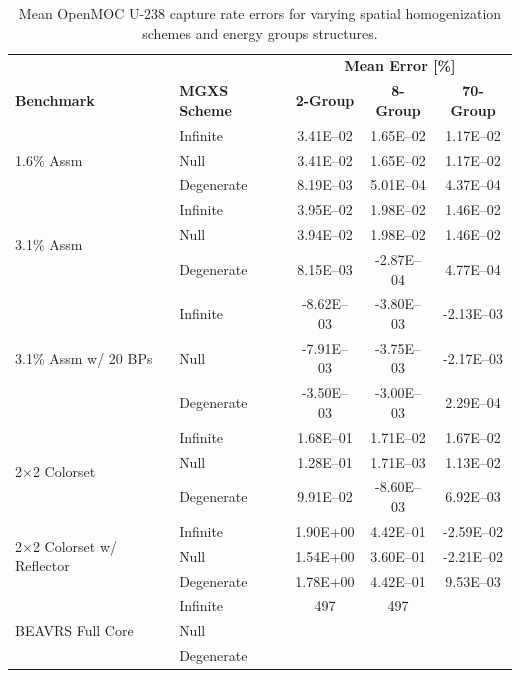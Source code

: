 \begin{table}[h!]
  \centering
  \caption[Mean OpenMOC U-238 capture rate errors]{Mean OpenMOC U-238 capture rate errors for varying spatial homogenization schemes and energy groups structures.}
  \small
  \label{table:chap8-openmoc-mean-capt-rates}
  \vspace{6pt}
  \begin{tabular}{l l c c c}
  \toprule
  \rowcolor{lightgray}
  & & \multicolumn{3}{c}{\cellcolor{lightgray} \textbf{Mean Error [\%]}} \\
  \multirow{-2}{*}{\cellcolor{lightgray} \bf Benchmark} &
  \multirow{-2}{*}{\cellcolor{lightgray} \bf \ac{MGXS} Scheme} &
  {\cellcolor{lightgray} \bf 2-Group} &
  {\cellcolor{lightgray} \bf 8-Group} &
  {\cellcolor{lightgray} \bf 70-Group} \\
  \midrule
\multirow{3}{*}{\parbox{2.5cm}{1.6\% Assm}} & Infinite & 3.41E--02 & 1.65E--02 & 1.17E--02 \\
& Null & 3.41E--02 & 1.65E--02 & 1.17E--02 \\
& Degenerate & 8.19E--03 & 5.01E--04 & 4.37E--04 \\
  \midrule
\multirow{3}{*}{\parbox{2.5cm}{3.1\% Assm}} & Infinite & 3.95E--02 & 1.98E--02 & 1.46E--02 \\
& Null & 3.94E--02 & 1.98E--02 & 1.46E--02 \\
& Degenerate & 8.15E--03 & -2.87E--04 & 4.77E--04 \\
  \midrule
\multirow{3}{*}{\parbox{2.5cm}{3.1\% Assm w/ 20 BPs}} & Infinite & -8.62E--03 & -3.80E--03 & -2.13E--03 \\
& Null & -7.91E--03 & -3.75E--03 & -2.17E--03 \\
& Degenerate & -3.50E--03 & -3.00E--03 & 2.29E--04 \\
  \midrule
\multirow{3}{*}{\parbox{2.5cm}{2$\times$2 Colorset}} & Infinite & 1.68E--01 & 1.71E--02 & 1.67E--02 \\
& Null & 1.28E--01 & 1.71E--03 & 1.13E--02 \\
& Degenerate & 9.91E--02 & -8.60E--03 & 6.92E--03 \\
  \midrule
\multirow{3}{*}{\parbox{2.5cm}{2$\times$2 Colorset w/ Reflector}} & Infinite & 1.90E+00 & 4.42E--01 & -2.59E--02 \\
& Null & 1.54E+00 & 3.60E--01 & -2.21E--02 \\
& Degenerate & 1.78E+00 & 4.42E--01 & 9.53E--03 \\
  \midrule
  \multirow{3}{*}{\parbox{2cm}{\ac{BEAVRS} Full Core}} & Infinite & 497 & 497 & \\
  & Null & & & \\
  & Degenerate & & & \\
  \bottomrule
\end{tabular}
\end{table}


